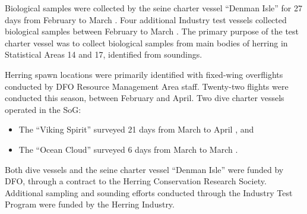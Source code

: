 Biological samples were collected by the seine charter vessel ``Denman Isle'' for 27 days from February  to March .
Four additional Industry test vessels collected biological samples between February  to March .
The primary purpose of the test charter vessel was to collect biological samples from main bodies of herring in Statistical Areas 14 and 17, identified from soundings.

Herring spawn locations were primarily identified with fixed-wing overflights conducted by DFO Resource Management Area staff.
Twenty-two flights were conducted this season, between February and April.
Two dive charter vessels operated in the SoG:
\begin{itemize}
\item The ``Viking Spirit'' surveyed 21 days from March  to April , and
\item The ``Ocean Cloud'' surveyed 6 days from March  to March .
\end{itemize}
Both dive vessels and the seine charter vessel ``Denman Isle'' were funded by DFO, through a contract to the Herring Conservation Research Society.
Additional sampling and sounding efforts conducted through the Industry Test Program were funded by the Herring Industry.